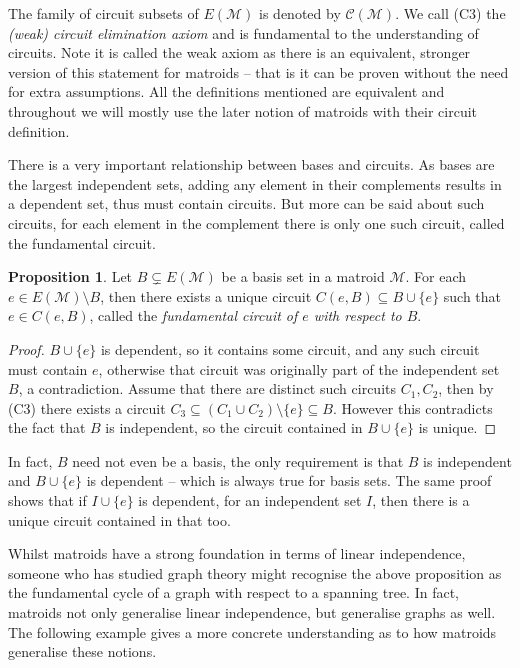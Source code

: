 \documentclass[12pt]{report}
\theoremstyle{definition}
\newtheorem{proposition}[theorem]{Proposition}
\def\calC{\mathcal C}
\def\calM{\mathcal M}
\theoremstyle{upright}
\begin{document}
The family of circuit subsets of $E(\calM)$ is denoted by $\calC(\calM)$.
We call (C3) the \textit{(weak) circuit elimination axiom} and is fundamental to the understanding of circuits.
Note it is called the weak axiom as there is an equivalent, stronger version of this statement for matroids -- that is it can be proven without the need for extra assumptions.
All the definitions mentioned are equivalent and throughout we will mostly use the later notion of matroids with their circuit definition.

There is a very important relationship between bases and circuits.
As bases are the largest independent sets, adding any element in their complements results in a dependent set, thus must contain circuits.
But more can be said about such circuits, for each element in the complement there is only one such circuit, called the fundamental circuit.

\begin{proposition}

    Let $B\subsetneq E(\calM)$ be a basis set in a matroid $\calM$.
    For each $e\in E(\calM)\setminus B$, then there exists a unique circuit $C(e, B)\subseteq B\cup\{e\}$ such that $e\in C(e, B)$, called the \textit{fundamental circuit of $e$ with respect to $B$}.
    
\end{proposition}

\begin{proof}

    $B\cup\{e\}$ is dependent, so it contains some circuit, and any such circuit must contain $e$, otherwise that circuit was originally part of the independent set $B$, a contradiction.
    Assume that there are distinct such circuits $C_1, C_2$, then by (C3) there exists a circuit $C_3\subseteq(C_1\cup C_2)\setminus\{e\}\subseteq B$.
    However this contradicts the fact that $B$ is independent, so the circuit contained in $B\cup\{e\}$ is unique.
    
\end{proof}

In fact, $B$ need not even be a basis, the only requirement is that $B$ is independent and $B\cup\{e\}$ is dependent -- which is always true for basis sets.
The same proof shows that if $I\cup\{e\}$ is dependent, for an independent set $I$, then there is a unique circuit contained in that too.

Whilst matroids have a strong foundation in terms of linear independence, someone who has studied graph theory might recognise the above proposition as the fundamental cycle of a graph with respect to a spanning tree.
In fact, matroids not only generalise linear independence, but generalise graphs as well.
The following example gives a more concrete understanding as to how matroids generalise these notions.
\end{document}
